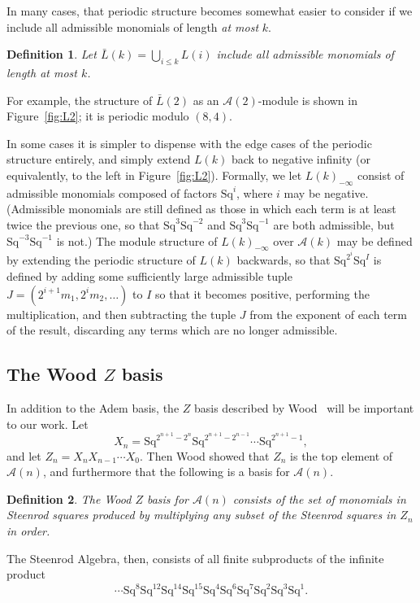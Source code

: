 \documentclass{article}
\newcommand{\A}{\mathcal{A}}
\newcommand{\Sq}{\mathrm{Sq}}
\renewcommand{\L}{\bar{L}}
\newcommand{\Lkm}[1][k]{L{(#1)}_{-\infty}}
\newtheorem{defn}{Definition}
\begin{document}
In many cases, that periodic structure becomes somewhat easier to consider if we include all admissible monomials of length \emph{at most} $k$.
\begin{defn}
  Let $\L(k)=\bigcup_{i\leq k}L(i)$ include all admissible monomials of length \emph{at most} $k$.
\end{defn}

For example, the structure of $\L(2)$ as an $\A(2)$-module is shown in Figure~\ref{fig:L2}; it is periodic modulo $(8, 4)$.

In some cases it is simpler to dispense with the edge cases of the periodic structure entirely, and simply extend $L(k)$ back to negative infinity (or equivalently, to the left in Figure~\ref{fig:L2}).  Formally, we let $\Lkm$ consist of admissible monomials composed of factors $\Sq^i$, where $i$ may be negative.  (Admissible monomials are still defined as those in which each term is at least twice the previous one, so that $\Sq^3\Sq^{-2}$ and $\Sq^3\Sq^{-1}$ are both admissible, but $\Sq^{-3}\Sq^{-1}$ is not.)  The module structure of $\Lkm$ over $\A(k)$ may be defined by extending the periodic structure of $L(k)$ backwards, so that $\Sq^{2^i}\Sq^I$ is defined by adding some sufficiently large admissible tuple $J=(2^{i+1}m_1, 2^im_2, \ldots)$ to $I$ so that it becomes positive, performing the multiplication, and then subtracting the tuple $J$ from the exponent of each term of the result, discarding any terms which are no longer admissible.


\subsection{The Wood \boldmath$Z$ basis}
In addition to the Adem basis, the $Z$ basis described by Wood~\cite{wood} will be important to our work.  Let
\[ X_n = \Sq^{2^{n+1}-2^n}\Sq^{2^{n+1}-2^{n-1}}\cdots\Sq^{2^{n+1}-1}, \]
and let $Z_n = X_n X_{n-1}\cdots X_0$.  Then Wood showed that $Z_n$ is the top element of $\A(n)$, and furthermore that the following is a basis for $\A(n)$.
\begin{defn}
  The Wood $Z$ basis for $\A(n)$ consists of the set of monomials in Steenrod squares produced by multiplying any subset of the Steenrod squares in $Z_n$ in order.
\end{defn}

The Steenrod Algebra, then, consists of all finite subproducts of the infinite product
\[ \cdots\Sq^8\Sq^{12}\Sq^{14}\Sq^{15}\Sq^4\Sq^6\Sq^7\Sq^2\Sq^3\Sq^1.\]
\end{document}
